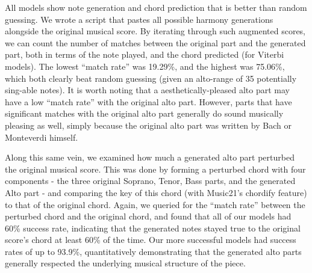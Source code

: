 \documentclass[11pt]{article}
\begin{document}
All models show note generation and chord prediction that is better than random guessing. We wrote a script that pastes all possible harmony generations alongside the original musical score. By iterating through such augmented scores, we can count the number of matches between the original part and the generated part, both in terms of the note played, and the chord predicted (for Viterbi models). The lowest ``match rate'' was 19.29\%, and the highest was 75.06\%, which both clearly beat random guessing (given an alto-range of 35 potentially sing-able notes). It is worth noting that a aesthetically-pleased alto part may have a low ``match rate'' with the original alto part. However, parts that have significant matches with the original alto part generally do sound musically pleasing as well, simply because the original alto part was written by Bach or Monteverdi himself. 

Along this same vein, we examined how much a generated alto part perturbed the original musical score. This was done by forming a perturbed chord with four components - the three original Soprano, Tenor, Bass parts, and the generated Alto part - and comparing the key of this chord (with Music21's chordify feature) to that of the original chord. Again, we queried for the ``match rate'' between the perturbed chord and the original chord, and found that all of our models had 60\% success rate, indicating that the generated notes stayed true to the original score's chord at least 60\% of the time. Our more successful models had success rates of up to 93.9\%, quantitatively demonstrating that the generated alto parts generally respected the underlying musical structure of the piece. 
\end{document}
